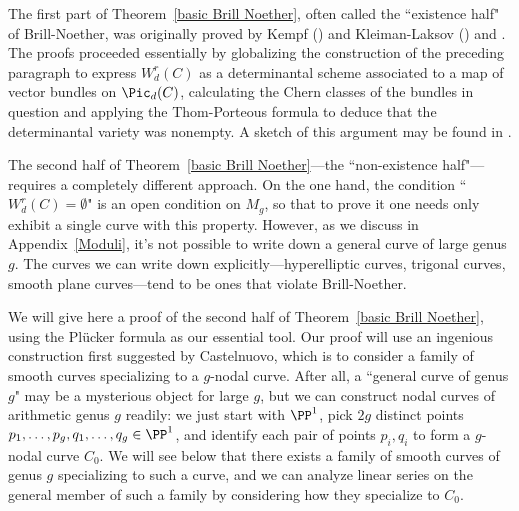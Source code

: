 %
%
The first part of Theorem~\ref{basic Brill Noether}, often called the ``existence half" of Brill-Noether, was originally proved by Kempf (\cite{Kempf}) and Kleiman-Laksov (\cite{MR323792}) and \cite{MR0357398}. The proofs proceeded essentially by globalizing the construction of the preceding paragraph to express $W^r_d(C)$ as a determinantal scheme associated to a map of vector bundles on $\Pic_d(C)$, calculating the Chern classes of the bundles in question and applying the Thom-Porteous formula to deduce that the determinantal variety was nonempty. A sketch of this argument may  be found in \cite[Appendix D.3]{3264}.  

The second half of Theorem~\ref{basic Brill Noether}---the ``non-existence half"---requires a completely different approach. On the one hand, the condition ``$W^r_d(C) = \emptyset$" is an open condition on $M_g$, so that to prove it one needs only exhibit a single curve with this property. However, as we discuss in Appendix~\ref{Moduli}, it's not possible to write down a general curve of large genus $g$. The curves we can write down explicitly---hyperelliptic curves, trigonal curves, smooth plane curves---tend to be ones that violate Brill-Noether.

We will give here a proof of the second half of Theorem~\ref{basic Brill Noether}, using the Pl\"ucker formula as our essential tool.
Our proof will use an ingenious construction first suggested by Castelnuovo, which is to consider a family of smooth curves specializing to a $g$-nodal curve. After all, 
a ``general curve of genus $g$" may be a mysterious object for large $g$, but we can construct nodal curves of arithmetic genus $g$ readily: we just start with $\PP^1$, pick $2g$ distinct points $p_1,\dots,p_g, q_1,\dots,q_g \in \PP^1$, and identify each pair of points $p_i, q_i$ to form a $g$-nodal curve $C_0$. We will see below that there exists a family of smooth curves of genus $g$ specializing to such a curve, and we can analyze linear series on the general member of such a family by considering how they specialize to $C_0$.

